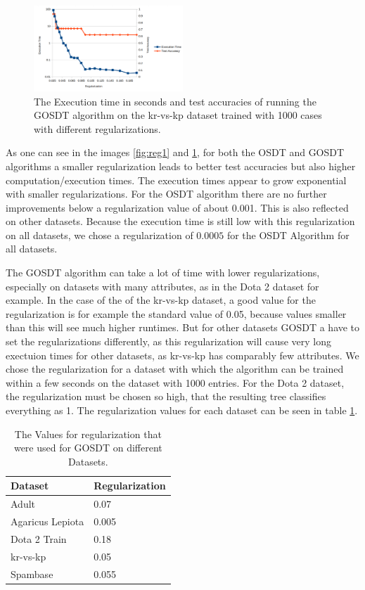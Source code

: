 \documentclass[a4paper,preprint]{sig-alternate-xt}
\begin{document}
\begin{figure}[h]
    \centering
    \includegraphics[width=0.5\textwidth]{regtest_gosdt.png}
    \caption{The Execution time in seconds and test accuracies of running the GOSDT algorithm on the kr-vs-kp dataset trained with 1000 cases with different regularizations.}
    \label{fig:reg2}
\end{figure}

As one can see in the images \ref{fig:reg1} and \ref{fig:reg2}, for both the OSDT and GOSDT algorithms a smaller regularization leads to better test accuracies but also higher computation/execution times. The execution times appear to grow exponential with smaller regularizations. 
For the OSDT algorithm there are no further improvements below a regularization value of about 0.001. This is also reflected on other datasets. Because the execution time is still low with this regularization on all datasets, we chose a regularization of $0.0005$ for the OSDT Algorithm for all datasets.

The GOSDT algorithm can take a lot of time with lower regularizations, especially on datasets with many attributes, as in the Dota 2 dataset for example. In the case of the of the kr-vs-kp dataset, a good value for the regularization is for example the standard value of 0.05, because values smaller than this will see much higher runtimes. 
But for other datasets GOSDT a have to set the regularizations differently, as this regularization will cause very long exectuion times for other datasets, as kr-vs-kp has comparably few attributes. We chose the regularization for a dataset with which the algorithm can be trained within a few seconds on the dataset with 1000 entries. For the Dota 2 dataset, the regularization must be chosen so high, that the resulting tree classifies everything as 1. The regularization values for each dataset can be seen in table \ref{table:gosdt_regs}.

\begin{table}[]
\begin{tabular}{l|l}
Dataset          & Regularization \\ \hline
Adult            & 0.07           \\
Agaricus Lepiota & 0.005          \\
Dota 2 Train     & 0.18           \\
kr-vs-kp         & 0.05           \\
Spambase         & 0.055         
\end{tabular}
\label{table:gosdt_regs}
\caption{The Values for regularization that were used for GOSDT on different Datasets.}
\end{table}
\end{document}
